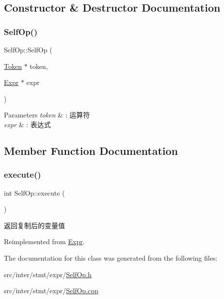 \subsection{Constructor \& Destructor Documentation}
\mbox{\label{class_self_op_a5292e81fca1817185db15b29564a32ee}} 
\subsubsection{\texorpdfstring{Self\+Op()}{SelfOp()}}
{\footnotesize\ttfamily Self\+Op\+::\+Self\+Op (\begin{DoxyParamCaption}\item[{\hyperlink{class_token}{Token} $\ast$}]{token,  }\item[{\hyperlink{class_expr}{Expr} $\ast$}]{expr }\end{DoxyParamCaption})}


\begin{DoxyParams}{Parameters}
{\em token} & \+: 运算符 \\
\hline
{\em expr} & \+: 表达式 \\
\hline
\end{DoxyParams}


\subsection{Member Function Documentation}
\mbox{\label{class_self_op_ab452bcad1cd4f1286813b1f737583818}} 
\subsubsection{\texorpdfstring{execute()}{execute()}}
{\footnotesize\ttfamily int Self\+Op\+::execute (\begin{DoxyParamCaption}{ }\end{DoxyParamCaption})\hspace{0.3cm}{\ttfamily [virtual]}}



返回复制后的变量值 



Reimplemented from \hyperlink{class_expr_aff6a2e6eaa460e2a3db28ebdab089b51}{Expr}.



The documentation for this class was generated from the following files\+:\begin{DoxyCompactItemize}
\item 
src/inter/stmt/expr/\hyperlink{_self_op_8h}{Self\+Op.\+h}\item 
src/inter/stmt/expr/\hyperlink{_self_op_8cpp}{Self\+Op.\+cpp}\end{DoxyCompactItemize}
